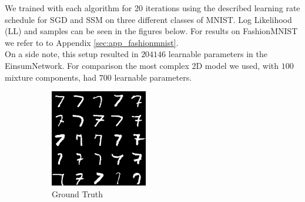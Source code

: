We trained with each algorithm for 20 iterations using the described learning rate schedule for SGD and SSM on three different classes of MNIST. 
Log Likelihood (LL) and samples can be seen in the figures below.
For results on FashionMNIST we refer to to Appendix \ref{sec:app_fashionmnist}. \\

On a side note, this setup resulted in $204146$ learnable parameters in the EinsumNetwork. For comparison the most 
complex 2D model we used, with $100$ mixture components, had $700$ learnable parameters. 

\begin{figure}[H]
    \centering
    \begin{subfigure}[b]{0.24\textwidth}
        \centering
        \includegraphics[width=\textwidth]{figures/einsum/mnist/[7]_ground_truth.png}
        \caption{Ground Truth}
    \end{subfigure}
    \begin{subfigure}[b]{0.24\textwidth}
        \centering

\end{subfigure}
\end{figure}

